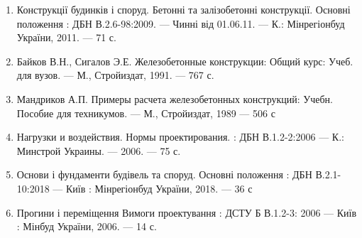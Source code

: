 \documentclass[a4paper,14pt]{article}
\begin{document}
\begin{enumerate}
    \item Конструкції будинків і споруд. Бетонні та залізобетонні
    конструкції. Основні положення : ДБН В.2.6-98:2009. --- Чинні від 01.06.11.
    --- К.: Мінрегіонбуд України, 2011. --- 71 с.
    \item Байков В.Н., Сигалов Э.Е. Железобетонные конструкции: Общий
    курс: Учеб. для вузов. --- М., Стройиздат, 1991. --- 767 с.
    \item Мандриков А.П. Примеры расчета железобетонных конструкций:
    Учебн. Пособие для техникумов. --- М., Стройиздат, 1989 --- 506 с
    \item Нагрузки и воздействия. Нормы проектирования. : ДБН В.1.2-2:2006
    --- К.: Минстрой Украины. --- 2006. --- 75 с.
    \item Основи і фундаменти будівель та споруд. Основні положення :
    ДБН В.2.1-10:2018 --- Київ : Мінрегіонбуд України, 2018. --- 36 с
    \item Прогини і переміщення Вимоги проектування : ДСТУ Б В.1.2-3:
    2006 --- Київ : Мінбуд України, 2006. --- 14 с.
\end{enumerate}
\newpage
\end{document}
